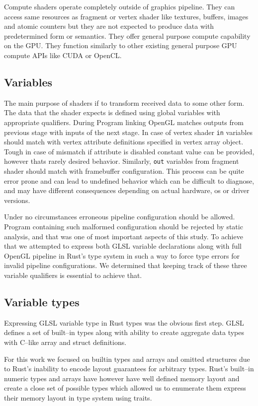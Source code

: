 Compute shaders operate completely outside of graphics pipeline. They can access same resources as fragment or vertex shader like textures, buffers, images and atomic counters
but they are not expected to produce data with predetermined form or semantics. They offer general purpose compute capability on the GPU. 
They function similarly to other existing general purpose GPU compute APIs like CUDA or OpenCL.

\subsection{Variables}

The main purpose of shaders if to transform received data to some other form. The data that the shader expects is defined using global variables with appropriate qualifiers.
During Program linking OpenGL matches outputs from previous stage with inputs of the next stage. 
In case of vertex shader \texttt{in} variables should match with vertex attribute definitions specified in vertex array object.
Tough in case of mismatch if attribute is disabled constant value can be provided, however thats rarely desired behavior.
Similarly, \texttt{out} variables from fragment shader should match with framebuffer configuration.
This process can be quite error prone and can lead to undefined behavior which can be difficult to diagnose, and may have different consequences depending on actual hardware, os or driver versions.

Under no circumstances erroneous pipeline configuration should be allowed. Program containing such malformed configuration should be rejected by static analysis, and that was one of most important aspects of this study.
To achieve that we attempted to express both GLSL variable declarations along with full OpenGL pipeline in Rust's type system in such a way to force type errors for invalid pipeline configurations.
We determined that keeping track of these three variable qualifiers is essential to achieve that.

\subsection{Variable types}

Expressing GLSL variable type in Rust types was the obvious first step. GLSL defines a set of built--in types along with ability to create aggregate data types with C--like array and struct definitions.

For this work we focused on builtin types and arrays and omitted structures due to Rust's inability to encode layout guarantees for arbitrary types.
Rust's built--in numeric types and arrays have however have well defined memory layout and create a close set of possible types which allowed us to enumerate them express their memory layout in type system using traits.

